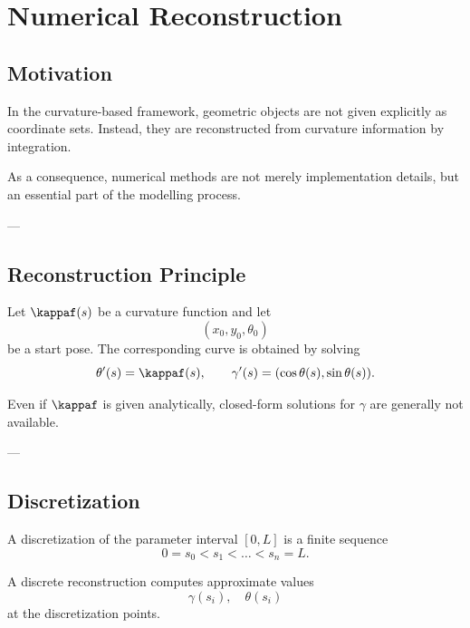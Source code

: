\chapter{Numerical Reconstruction}

\section{Motivation}

\begin{remark}
In the curvature-based framework, geometric objects are not given
explicitly as coordinate sets. Instead, they are reconstructed from
curvature information by integration.
\end{remark}

\begin{remark}
As a consequence, numerical methods are not merely implementation
details, but an essential part of the modelling process.
\end{remark}

---

\section{Reconstruction Principle}

\begin{definition}
Let $\kappaf(s)$ be a curvature function and let
\[
(x_0,y_0,\theta_0)
\]
be a start pose. The corresponding curve is obtained by solving
\[
\theta'(s) = \kappaf(s),
\qquad
\gamma'(s) = (\cos\theta(s),\sin\theta(s)).
\]
\end{definition}

\begin{remark}
Even if $\kappaf$ is given analytically, closed-form solutions for
$\gamma$ are generally not available.
\end{remark}

---

\section{Discretization}

\begin{definition}[Discretization]
A discretization of the parameter interval $[0,L]$ is a finite sequence
\[
0 = s_0 < s_1 < \dots < s_n = L.
\]
\end{definition}

\begin{definition}
A discrete reconstruction computes approximate values
\[
\gamma(s_i), \quad \theta(s_i)
\]
at the discretization points.
\end{definition}

